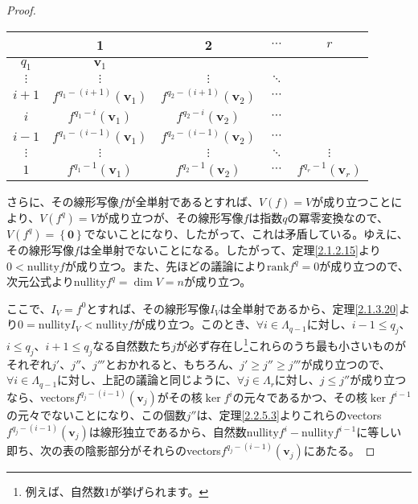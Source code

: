 \documentclass[dvipdfmx]{jsarticle}
\begin{document}
\begin{proof}
\begin{longtable}[c]{c|cccc}
&1&2&$\cdots$&$r$ \\
\hline
$q_{1}$ & $\mathbf{v}_{1}$ & & & \\
$\vdots$ & $\vdots$ & $\vdots$ & $\ddots$ & \\
$i + 1$ & \cellcolor{lightgray} $f^{q_{1} - (i + 1)}\left( \mathbf{v}_{1} \right)$ & \cellcolor{lightgray} $f^{q_{2} - (i + 1)}\left( \mathbf{v}_{2} \right)$ & \cellcolor{lightgray} $\cdots$ & \\
$i$ & $f^{q_{1} - i}\left( \mathbf{v}_{1} \right)$ & $f^{q_{2} - i}\left( \mathbf{v}_{2} \right)$ & $\cdots$ & \\
$i - 1$ & $f^{q_{1} - (i - 1)}\left( \mathbf{v}_{1} \right)$ & $f^{q_{2} - (i - 1)}\left( \mathbf{v}_{2} \right)$ & $\cdots$ & \\
$\vdots$ & $\vdots$ & $\vdots$ & $\ddots$ & $\vdots$ \\
$1$ & $f^{q_{1} - 1}\left( \mathbf{v}_{1} \right)$ & $f^{q_{2} - 1}\left( \mathbf{v}_{2} \right)$ & $\cdots$ &
$f^{q_{r} - 1}\left( \mathbf{v}_{r} \right)$ \\
\end{longtable}\par
さらに、その線形写像$f$が全単射であるとすれば、$V(f) = V$が成り立つことにより、$V\left( f^{q} \right) = V$が成り立つが、その線形写像$f$は指数$q$の冪零変換なので、$V\left( f^{q} \right) = \left\{ \mathbf{0} \right\}$でないことになり、したがって、これは矛盾している。ゆえに、その線形写像$f$は全単射でないことになる。したがって、定理\ref{2.1.2.15}より$0 < {\mathrm{nullity}}f$が成り立つ。また、先ほどの議論により${\mathrm{rank}}f^{q} = 0$が成り立つので、次元公式より${\mathrm{nullity}}f^{q} = \dim V = n$が成り立つ。\par
ここで、$I_{V} = f^{0}$とすれば、その線形写像$I_{V}$は全単射であるから、定理\ref{2.1.3.20}より$0 = {\mathrm{nullity}}I_{V} < {\mathrm{nullity}}f$が成り立つ。このとき、$\forall i \in \varLambda_{q - 1}$に対し、$i - 1 \leq q_{j}$、$i \leq q_{j}$、$i + 1 \leq q_{j}$なる自然数たち$j$が必ず存在し\footnote{例えば、自然数$1$が挙げられます。}これらのうち最も小さいものがそれぞれ$j'$、$j''$、$j'''$とおかれると、もちろん、$j' \geq j'' \geq j'''$が成り立つので、$\forall i \in \varLambda_{q - 1}$に対し、上記の議論と同じように、$\forall j \in \varLambda_{r}$に対し、$j \leq j''$が成り立つなら、vectors$f^{q_{j} - (i - 1)}\left( \mathbf{v}_{j} \right)$がその核$\ker f^{i}$の元々であるかつ、その核$\ker f^{i - 1}$の元々でないことになり、この個数$j''$は、定理\ref{2.2.5.3}よりこれらのvectors$f^{q_{j} - (i - 1)}\left( \mathbf{v}_{j} \right)$は線形独立であるから、自然数${\mathrm{nullity}}f^{i} - {\mathrm{nullity}}f^{i - 1}$に等しい即ち、次の表の陰影部分がそれらのvectors$f^{q_{j} - (i - 1)}\left( \mathbf{v}_{j} \right)$にあたる。

\end{proof}
\end{document}
